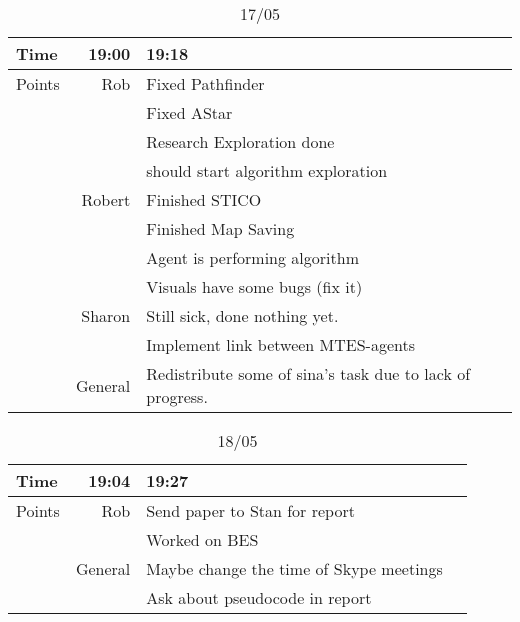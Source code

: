 \documentclass{article}
\begin{document}
		\begin{table}[h!]
		\caption{17/05}
			\begin{tabularx}{\textwidth}{l|rlX}
			\hline
		
			\hline
			Time 	& 19:00 & 19:18 &\\\hline
			Points 	& Rob 	&	Fixed Pathfinder&\\
					&		&	Fixed AStar&\\
					&		&	Research Exploration done&\\
					&		&	should start algorithm exploration&\\
					& Robert&	Finished STICO&\\
					&		&	Finished Map Saving&\\
					&		&	Agent is performing algorithm&\\
					&		&	Visuals have some bugs (fix it)&\\
					& Sharon&	Still sick, done nothing yet.&\\
					&		&	Implement link between MTES-agents&\\
					& General &	Redistribute some of sina's task due to lack of progress.&\\
			\hline
		
			\hline
			\end{tabularx}
		\end{table}

	
		\begin{table}[h!]
		\caption{18/05}
			\begin{tabularx}{\textwidth}{l|rlX}
			\hline
		
			\hline
			Time 	& 19:04 & 19:27 &\\\hline
			Points 	& Rob 	&	Send paper to Stan for report&\\
					&		&	Worked on BES&\\
					&General&	Maybe change the time of Skype meetings&\\
					&		&	Ask about pseudocode in report&\\
			\hline
		
			\hline
			\end{tabularx}
		\end{table}
\end{document}
